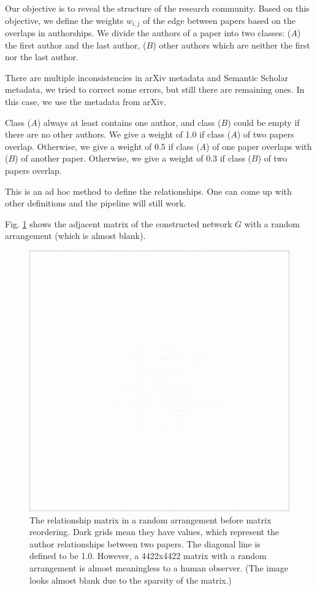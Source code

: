 Our objective is to reveal the structure of the research community.
Based on this objective, we define the weights $w_{i,j}$ of the edge between papers based on the overlaps in authorships.
We divide the authors of a paper into two classes: ($A$) the first author and the last author, ($B$) other authors which are neither the first nor the last author.

There are multiple inconsistencies in arXiv metadata and Semantic Scholar metadata, we tried to correct some errors, but still there are remaining ones.
In this case, we use the metadata from arXiv.

Class ($A$) always at least contains one author, and class ($B$) could be empty if there are no other authors.
We give a weight of 1.0 if class ($A$) of two papers overlap.
Otherwise, we give a weight of 0.5 if class ($A$) of one paper overlaps with ($B$) of another paper.
Otherwise, we give a weight of 0.3 if class ($B$) of two papers overlap.

This is an ad hoc method to define the relationships.
One can come up with other definitions and the pipeline will still work.

Fig. \ref{fig:matrix_random_arrangement} shows the adjacent matrix of the constructed network $G$ with a random arrangement (which is almost blank).

\begin{figure}
    \centering
    \includegraphics[width=\textwidth]{images/random_arrangement.png}
    \caption{The relationship matrix in a random arrangement before matrix reordering.
        Dark grids mean they have values, which represent the author relationships between two papers.
        The diagonal line is defined to be 1.0.
        However, a 4422x4422 matrix with a random arrangement is almost meaningless to a human observer.
        (The image looks almost blank due to the sparsity of the matrix.)
    }
    \label{fig:matrix_random_arrangement}
\end{figure}
